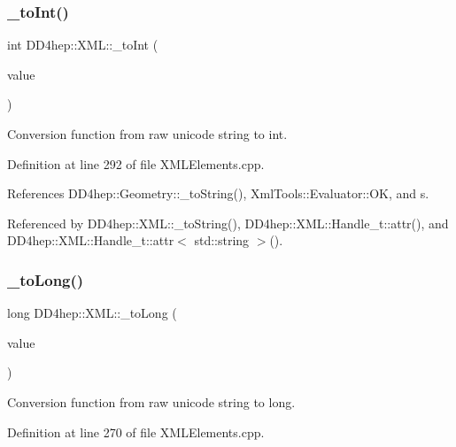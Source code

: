 \subsubsection{\texorpdfstring{\+\_\+to\+Int()}{\_toInt()}}
{\footnotesize\ttfamily int D\+D4hep\+::\+X\+M\+L\+::\+\_\+to\+Int (\begin{DoxyParamCaption}\item[{const \hyperlink{namespace_d_d4hep_1_1_x_m_l_a09e5d9cc86ed782f6826dfe0778c1815}{Xml\+Char} $\ast$}]{value }\end{DoxyParamCaption})}



Conversion function from raw unicode string to int. 



Definition at line 292 of file X\+M\+L\+Elements.\+cpp.



References D\+D4hep\+::\+Geometry\+::\+\_\+to\+String(), Xml\+Tools\+::\+Evaluator\+::\+OK, and s.



Referenced by D\+D4hep\+::\+X\+M\+L\+::\+\_\+to\+String(), D\+D4hep\+::\+X\+M\+L\+::\+Handle\+\_\+t\+::attr(), and D\+D4hep\+::\+X\+M\+L\+::\+Handle\+\_\+t\+::attr$<$ std\+::string $>$().

\hypertarget{group___d_d4_h_e_p___x_m_l_ga0da6cdd75009487075f485c74a034a7b}{}\label{group___d_d4_h_e_p___x_m_l_ga0da6cdd75009487075f485c74a034a7b} 
\subsubsection{\texorpdfstring{\+\_\+to\+Long()}{\_toLong()}}
{\footnotesize\ttfamily long D\+D4hep\+::\+X\+M\+L\+::\+\_\+to\+Long (\begin{DoxyParamCaption}\item[{const \hyperlink{namespace_d_d4hep_1_1_x_m_l_a09e5d9cc86ed782f6826dfe0778c1815}{Xml\+Char} $\ast$}]{value }\end{DoxyParamCaption})}



Conversion function from raw unicode string to long. 



Definition at line 270 of file X\+M\+L\+Elements.\+cpp.



